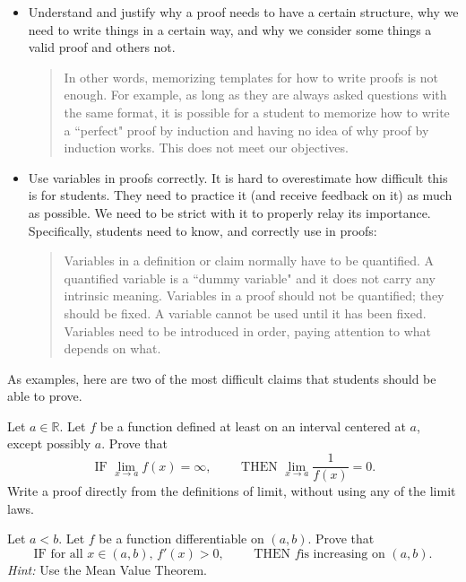 \documentclass[11pt]{article}
\begin{document}
\begin{itemize}
		\item Understand and justify why a proof needs to have a certain structure,
			why we need to write things in a certain way, and why we consider some things
			a valid proof and others not.

			\begin{quote}
				In other words, memorizing templates for how to write proofs is not
				enough. For example, as long as they are always asked questions with the
				same format, it is possible for a student to memorize how to write a ``perfect"
				proof by induction and having no idea of why proof by induction works. This
				does not meet our objectives.
			\end{quote}

		\item Use variables in proofs correctly. It is hard to overestimate how
			difficult this is for students. They need to practice it (and receive
			feedback on it) as much as possible. We need to be strict with it to
			properly relay its importance. Specifically, students need to know, and correctly
			use in proofs:
			\begin{quote}
				Variables in a definition or claim normally have to be quantified. A
				quantified variable is a ``dummy variable" and it does not carry any intrinsic
				meaning. Variables in a proof should not be quantified; they should be fixed.
				A variable cannot be used until it has been fixed. Variables need to be introduced
				in order, paying attention to what depends on what.
			\end{quote}
	\end{itemize}

	As examples, here are two of the most difficult claims that students should be
	able to prove.

	\begin{exercise}
		{} Let $a \in \mathbb{R}$. Let $f$ be a function defined at least on an
		interval centered at $a$, except possibly $a$. Prove that
		\[
			\text{ IF }\lim_{x \to a}f(x) = \infty, \quad \quad \text{ THEN }\lim_{x
			\to a}\frac{1}{f(x)}= 0.
		\]
		Write a proof directly from the definitions of limit, without using any of the
		limit laws.
	\end{exercise}

	\begin{exercise}
		{} Let $a <b.$ Let $f$ be a function differentiable on $(a,b)$. Prove that
		\[
			\text{IF for all }x \in (a,b), \, f'(x)>0, \quad \quad \text{ THEN }f \text{
			is increasing on }(a,b).
		\]
		\emph{Hint:} Use the Mean Value Theorem.
	\end{exercise}
\end{document}
